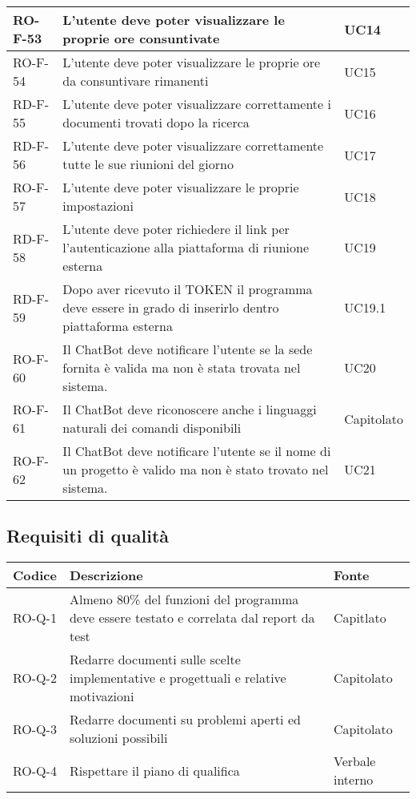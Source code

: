 \begin{center}
\begin{tabular}{ | m{8em} | m{18em} | m{12em} | }
\hline
RO-F-53&L’utente deve poter visualizzare le proprie ore consuntivate &UC14 \\
\hline
RO-F-54&L’utente deve poter visualizzare le proprie ore da consuntivare rimanenti &UC15 \\
\hline
RD-F-55&L’utente deve poter visualizzare correttamente i documenti trovati dopo la ricerca &UC16 \\
\hline
RD-F-56&L’utente deve poter visualizzare correttamente tutte le sue riunioni del giorno & UC17\\
\hline
RO-F-57&L’utente deve poter visualizzare le proprie impostazioni &UC18 \\
\hline
RD-F-58&L’utente deve poter richiedere il link per l’autenticazione alla piattaforma di riunione esterna &UC19\\
\hline
RD-F-59&Dopo aver ricevuto il TOKEN il programma deve essere in grado di inserirlo dentro piattaforma esterna &UC19.1 \\
\hline
RO-F-60&Il ChatBot deve notificare l'utente se la sede fornita è valida ma non è stata trovata nel sistema.&UC20 \\
\hline
RO-F-61&Il ChatBot deve riconoscere anche i linguaggi naturali dei comandi disponibili &Capitolato \\
\hline
RO-F-62&Il ChatBot deve notificare l'utente se il nome di un progetto è valido ma non è stato trovato nel sistema. &UC21 \\
\hline
\end{tabular}
\end{center}
\newpage

\subsection{Requisiti di qualità}
\begin{center}
\renewcommand{\arraystretch}{1.8} %
\begin{tabular}{ | m{8em} | m{18em} | m{12em} | }
\hline
Codice&Descrizione&Fonte\\
\hline
RO-Q-1&Almeno 80\% del funzioni del programma deve essere testato e correlata dal report da test&Capitlato\\
\hline
RO-Q-2&Redarre documenti sulle scelte implementative e progettuali e relative motivazioni&Capitolato\\
\hline
RO-Q-3&Redarre documenti su problemi aperti ed soluzioni possibili&Capitolato\\
\hline
RO-Q-4&Rispettare il piano di qualifica&Verbale interno\\
\hline
\end{tabular}
\end{center}

